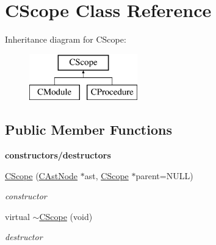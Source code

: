 \hypertarget{classCScope}{\section{C\-Scope Class Reference}
\label{classCScope}
}
Inheritance diagram for C\-Scope\-:\begin{figure}[H]
\begin{center}
\leavevmode
\includegraphics[height=2.000000cm]{classCScope}
\end{center}
\end{figure}
\subsection*{Public Member Functions}
\begin{Indent}{\bf constructors/destructors}\par
\begin{DoxyCompactItemize}
\item 
\hyperlink{classCScope_ae7a3a72387e6f535104aea7c3c4c8737}{C\-Scope} (\hyperlink{classCAstNode}{C\-Ast\-Node} $\ast$ast, \hyperlink{classCScope}{C\-Scope} $\ast$parent=N\-U\-L\-L)
\begin{DoxyCompactList}\small\item\em constructor \end{DoxyCompactList}\item 
\hypertarget{classCScope_a08a765b1fe5c60e25ad428cd05808cf2}{virtual \hyperlink{classCScope_a08a765b1fe5c60e25ad428cd05808cf2}{$\sim$\-C\-Scope} (void)}\label{classCScope_a08a765b1fe5c60e25ad428cd05808cf2}

\begin{DoxyCompactList}\small\item\em destructor \end{DoxyCompactList}\end{DoxyCompactItemize}
\end{Indent}
